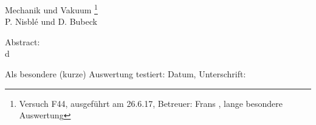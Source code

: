 \documentclass[12pt, a4paper]{scrartcl}
\begin{document}
\thispagestyle{empty}
	\null\vspace{40mm}
	\begin{center}
		{
			\Large Mechanik und Vakuum
			\footnote{
				\noindent Versuch F44, ausgeführt am 26.6.17,
				Betreuer: Frans ,
				lange besondere Auswertung
			}
		}\\[15mm]
		P. Nisblé und D. Bubeck

		\vspace{25mm}

		\parbox{0.9\textwidth}{
			Abstract:\\
			\small d
		}
	\end{center}

	\vfill
	Als besondere (kurze) Auswertung testiert: Datum, Unterschrift:
	\vspace{20mm}
	\newpage
	\null\thispagestyle{empty}
\end{document}
